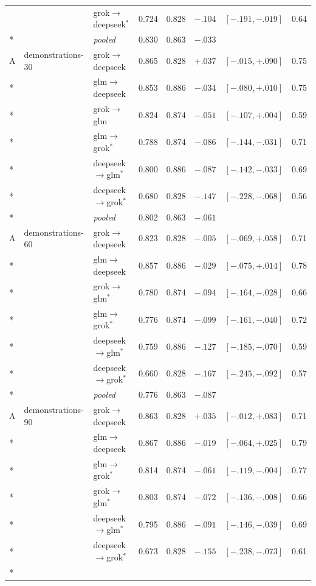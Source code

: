 {\begin{longtable}{lllrlrrr}
 &  & grok$\to$deepseek$^{*}$ & 0.724 & 0.828 & $-.104$ & $[-.191,-.019]$ & 0.64 \\*
 & & \emph{pooled} & 0.830 & 0.863 & $-.033$ & & \\
\addlinespace
A & demonstrations-30 & grok$\to$deepseek & 0.865 & 0.828 & $+.037$ & $[-.015,+.090]$ & 0.75 \\*
 &  & glm$\to$deepseek & 0.853 & 0.886 & $-.034$ & $[-.080,+.010]$ & 0.75 \\*
 &  & grok$\to$glm & 0.824 & 0.874 & $-.051$ & $[-.107,+.004]$ & 0.59 \\*
 &  & glm$\to$grok$^{*}$ & 0.788 & 0.874 & $-.086$ & $[-.144,-.031]$ & 0.71 \\*
 &  & deepseek$\to$glm$^{*}$ & 0.800 & 0.886 & $-.087$ & $[-.142,-.033]$ & 0.69 \\*
 &  & deepseek$\to$grok$^{*}$ & 0.680 & 0.828 & $-.147$ & $[-.228,-.068]$ & 0.56 \\*
 & & \emph{pooled} & 0.802 & 0.863 & $-.061$ & & \\
\addlinespace
A & demonstrations-60 & grok$\to$deepseek & 0.823 & 0.828 & $-.005$ & $[-.069,+.058]$ & 0.71 \\*
 &  & glm$\to$deepseek & 0.857 & 0.886 & $-.029$ & $[-.075,+.014]$ & 0.78 \\*
 &  & grok$\to$glm$^{*}$ & 0.780 & 0.874 & $-.094$ & $[-.164,-.028]$ & 0.66 \\*
 &  & glm$\to$grok$^{*}$ & 0.776 & 0.874 & $-.099$ & $[-.161,-.040]$ & 0.72 \\*
 &  & deepseek$\to$glm$^{*}$ & 0.759 & 0.886 & $-.127$ & $[-.185,-.070]$ & 0.59 \\*
 &  & deepseek$\to$grok$^{*}$ & 0.660 & 0.828 & $-.167$ & $[-.245,-.092]$ & 0.57 \\*
 & & \emph{pooled} & 0.776 & 0.863 & $-.087$ & & \\
\addlinespace
A & demonstrations-90 & grok$\to$deepseek & 0.863 & 0.828 & $+.035$ & $[-.012,+.083]$ & 0.71 \\*
 &  & glm$\to$deepseek & 0.867 & 0.886 & $-.019$ & $[-.064,+.025]$ & 0.79 \\*
 &  & glm$\to$grok$^{*}$ & 0.814 & 0.874 & $-.061$ & $[-.119,-.004]$ & 0.77 \\*
 &  & grok$\to$glm$^{*}$ & 0.803 & 0.874 & $-.072$ & $[-.136,-.008]$ & 0.66 \\*
 &  & deepseek$\to$glm$^{*}$ & 0.795 & 0.886 & $-.091$ & $[-.146,-.039]$ & 0.69 \\*
 &  & deepseek$\to$grok$^{*}$ & 0.673 & 0.828 & $-.155$ & $[-.238,-.073]$ & 0.61 \\*

\end{longtable}}
